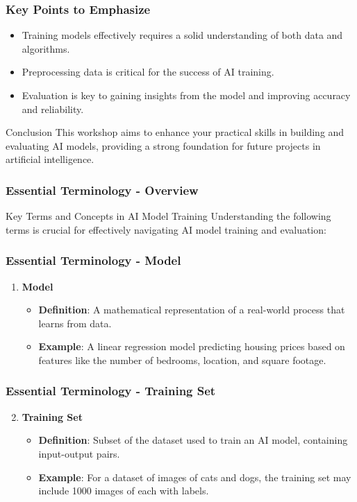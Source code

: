 \documentclass{beamer}
\begin{document}
\begin{frame}[fragile]
    \frametitle{Key Points to Emphasize}
    \begin{itemize}
        \item Training models effectively requires a solid understanding of both data and algorithms.
        \item Preprocessing data is critical for the success of AI training.
        \item Evaluation is key to gaining insights from the model and improving accuracy and reliability.
    \end{itemize}
    \begin{block}{Conclusion}
        This workshop aims to enhance your practical skills in building and evaluating AI models, providing a strong foundation for future projects in artificial intelligence.
    \end{block}
\end{frame}

\begin{frame}[fragile]
    \frametitle{Essential Terminology - Overview}
    \begin{block}{Key Terms and Concepts in AI Model Training}
        Understanding the following terms is crucial for effectively navigating AI model training and evaluation:
    \end{block}
\end{frame}

\begin{frame}[fragile]
    \frametitle{Essential Terminology - Model}
    \begin{enumerate}
        \item \textbf{Model}
        \begin{itemize}
            \item \textbf{Definition}: A mathematical representation of a real-world process that learns from data.
            \item \textbf{Example}: A linear regression model predicting housing prices based on features like the number of bedrooms, location, and square footage.
        \end{itemize}
    \end{enumerate}
\end{frame}

\begin{frame}[fragile]
    \frametitle{Essential Terminology - Training Set}
    \begin{enumerate}
        \setcounter{enumi}{1} %
        \item \textbf{Training Set}
        \begin{itemize}
            \item \textbf{Definition}: Subset of the dataset used to train an AI model, containing input-output pairs.
            \item \textbf{Example}: For a dataset of images of cats and dogs, the training set may include 1000 images of each with labels.
        \end{itemize}
    \end{enumerate}
\end{frame}
\end{document}
